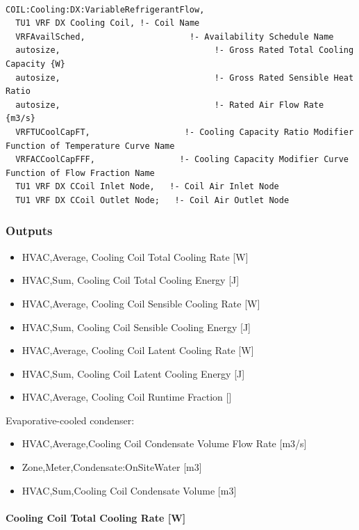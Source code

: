 \begin{lstlisting}

COIL:Cooling:DX:VariableRefrigerantFlow,
  TU1 VRF DX Cooling Coil, !- Coil Name
  VRFAvailSched,                     !- Availability Schedule Name
  autosize,                               !- Gross Rated Total Cooling Capacity {W}
  autosize,                               !- Gross Rated Sensible Heat Ratio
  autosize,                               !- Rated Air Flow Rate {m3/s}
  VRFTUCoolCapFT,                   !- Cooling Capacity Ratio Modifier Function of Temperature Curve Name
  VRFACCoolCapFFF,                 !- Cooling Capacity Modifier Curve Function of Flow Fraction Name
  TU1 VRF DX CCoil Inlet Node,   !- Coil Air Inlet Node
  TU1 VRF DX CCoil Outlet Node;   !- Coil Air Outlet Node
\end{lstlisting}

\subsubsection{Outputs}\label{outputs-5-003}

\begin{itemize}
\item
  HVAC,Average, Cooling Coil Total Cooling Rate {[}W{]}
\item
  HVAC,Sum, Cooling Coil Total Cooling Energy {[}J{]}
\item
  HVAC,Average, Cooling Coil Sensible Cooling Rate {[}W{]}
\item
  HVAC,Sum, Cooling Coil Sensible Cooling Energy {[}J{]}
\item
  HVAC,Average, Cooling Coil Latent Cooling Rate {[}W{]}
\item
  HVAC,Sum, Cooling Coil Latent Cooling Energy {[}J{]}
\item
  HVAC,Average, Cooling Coil Runtime Fraction {[]}
\end{itemize}

Evaporative-cooled condenser:

\begin{itemize}
\item
  HVAC,Average,Cooling Coil Condensate Volume Flow Rate {[}m3/s{]}
\item
  Zone,Meter,Condensate:OnSiteWater {[}m3{]}
\item
  HVAC,Sum,Cooling Coil Condensate Volume {[}m3{]}
\end{itemize}

\paragraph{Cooling Coil Total Cooling Rate {[}W{]}}\label{cooling-coil-total-cooling-rate-w-1}

